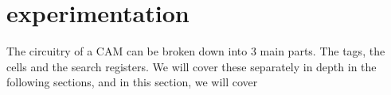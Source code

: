 \section{experimentation}
The circuitry of a CAM can be broken down into 3 main parts. The tags, the cells and the search registers. 
We will cover these separately in depth in the following sections, and in this section, we will cover 

